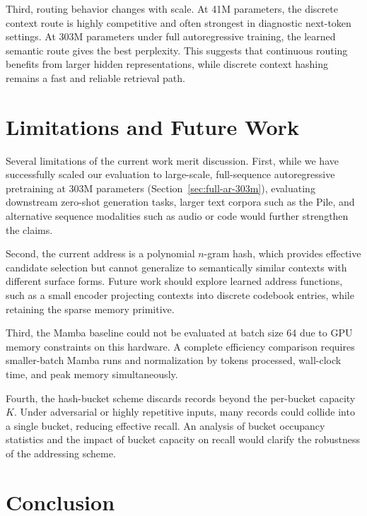 \documentclass[11pt]{article}
\begin{document}
Third, routing behavior changes with scale. At 41M parameters, the discrete
context route is highly competitive and often strongest in diagnostic
next-token settings. At 303M parameters under full autoregressive training,
the learned semantic route gives the best perplexity. This suggests that
continuous routing benefits from larger hidden representations, while discrete
context hashing remains a fast and reliable retrieval path.

\section{Limitations and Future Work}
\label{sec:limitations}

Several limitations of the current work merit discussion. First, while we have
successfully scaled our evaluation to large-scale, full-sequence autoregressive
pretraining at 303M parameters (Section~\ref{sec:full-ar-303m}), evaluating
downstream zero-shot generation tasks, larger text corpora such as the Pile,
and alternative sequence modalities such as audio or code would further
strengthen the claims.

Second, the current address is a polynomial $n$-gram hash, which provides
effective candidate selection but cannot generalize to semantically similar
contexts with different surface forms. Future work should explore learned
address functions, such as a small encoder projecting contexts into discrete
codebook entries, while retaining the sparse memory primitive.

Third, the Mamba baseline could not be evaluated at batch size 64 due to GPU
memory constraints on this hardware. A complete efficiency comparison requires
smaller-batch Mamba runs and normalization by tokens processed, wall-clock
time, and peak memory simultaneously.

Fourth, the hash-bucket scheme discards records beyond the per-bucket capacity
$K$. Under adversarial or highly repetitive inputs, many records could collide
into a single bucket, reducing effective recall. An analysis of bucket
occupancy statistics and the impact of bucket capacity on recall would
clarify the robustness of the addressing scheme.

\section{Conclusion}
\end{document}
